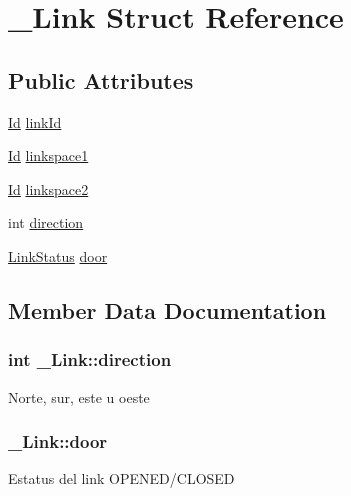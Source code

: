 \hypertarget{struct__Link}{}\section{\+\_\+\+Link Struct Reference}
\label{struct__Link}
\subsection*{Public Attributes}
\begin{DoxyCompactItemize}
\item 
\hyperlink{types_8h_a845e604fb28f7e3d97549da3448149d3}{Id} \hyperlink{struct__Link_a3c2eb94d5f272bf373c113a868e3d367}{link\+Id}
\item 
\hyperlink{types_8h_a845e604fb28f7e3d97549da3448149d3}{Id} \hyperlink{struct__Link_a851b2cb675c25aaa73ebbaa58b8db1a2}{linkspace1}
\item 
\hyperlink{types_8h_a845e604fb28f7e3d97549da3448149d3}{Id} \hyperlink{struct__Link_aac79e76abc5512cd08a381eb835d59f0}{linkspace2}
\item 
int \hyperlink{struct__Link_a112e92df8f8eae3055ab45793ed4a660}{direction}
\item 
\hyperlink{types_8h_aa60f669816b146d6373c62d9625e52ad}{Link\+Status} \hyperlink{struct__Link_ab4d6f65f126e9a41440828d2317b7a79}{door}
\end{DoxyCompactItemize}


\subsection{Member Data Documentation}
\subsubsection[{\texorpdfstring{direction}{direction}}]{\setlength{\rightskip}{0pt plus 5cm}int \+\_\+\+Link\+::direction}\hypertarget{struct__Link_a112e92df8f8eae3055ab45793ed4a660}{}\label{struct__Link_a112e92df8f8eae3055ab45793ed4a660}
Norte, sur, este u oeste 
\subsubsection[{\texorpdfstring{door}{door}}]{ \+\_\+\+Link\+::door}\hypertarget{struct__Link_ab4d6f65f126e9a41440828d2317b7a79}{}\label{struct__Link_ab4d6f65f126e9a41440828d2317b7a79}
Estatus del link O\+P\+E\+N\+E\+D/\+C\+L\+O\+S\+ED 
